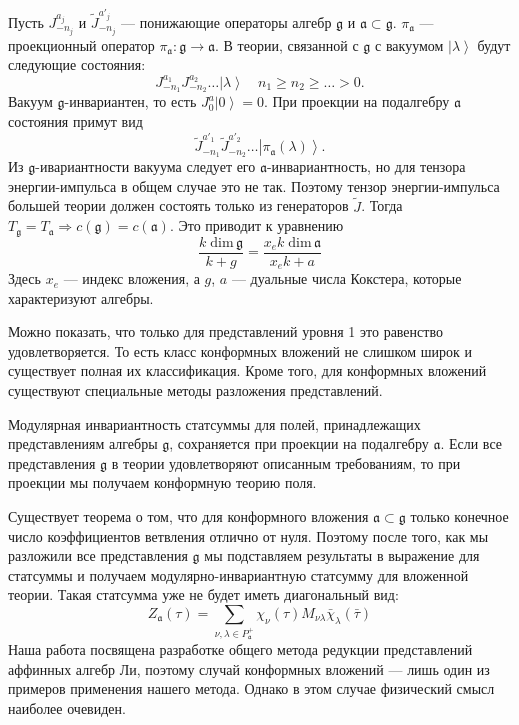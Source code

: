 \documentclass[a4paper,12pt]{article}
\theoremstyle{definition} \newtheorem{Def}{Definition}
\begin{document}
Пусть $J^{a_j}_{-n_j}$ и $\tilde{J}^{a'_j}_{-n_j}$ --- понижающие операторы алгебр  $\mathfrak{g}$ и
$\mathfrak{a}\subset\mathfrak{g}$.  $\pi_{\mathfrak{a}}$ --- проекционный оператор
$\pi_{\mathfrak{a}}:\mathfrak{g}\longrightarrow \mathfrak{a}$. В теории, связанной с  $\mathfrak{g}$
с вакуумом $\left|\lambda\right>$ будут следующие состояния:
\begin{equation}
  \label{eq:109}
  J^{a_1}_{-n_1}J^{a_2}_{-n_2}\dots\left|\lambda\right>\quad n_1\geq n_2\geq \dots>0.
\end{equation}
Вакуум $\mathfrak{g}$-инвариантен, то есть $J_0^a\left|0\right>=0$. При проекции на подалгебру
$\mathfrak{a}$ состояния примут вид
\begin{equation}
  \label{eq:110}
  \tilde{J}^{a'_1}_{-n_1}\tilde{J}^{a'_2}_{-n_2}\dots\left|\pi_{\mathfrak{a}}(\lambda)\right>.
\end{equation}
Из $\mathfrak{g}$-ивариантности вакуума следует его $\mathfrak{a}$-инвариантность, но для тензора
энергии-импульса в общем случае это не так. Поэтому тензор энергии-импульса большей теории должен
состоять только из генераторов $\tilde{J}$. Тогда $T_{\mathfrak{g}}=T_{\mathfrak{a}}\Rightarrow
c(\mathfrak{g})=c(\mathfrak{a})$. Это приводит к уравнению
\begin{equation}
  \label{eq:111}
  \frac{k\;\mathrm{dim}\,\mathfrak{g}}{k+g}=\frac{x_e k\; \mathrm{dim}\,\mathfrak{a}}{x_ek+a}
\end{equation}
Здесь $x_e$ --- индекс вложения, а  $g$, $a$ --- дуальные числа Кокстера, которые характеризуют алгебры.

Можно показать, что только для представлений уровня 1 это равенство удовлетворяется. То есть класс
конформных вложений не слишком широк и существует полная их классификация. Кроме того, для
конформных вложений существуют специальные методы разложения представлений.

Модулярная инвариантность статсуммы для полей, принадлежащих представлениям алгебры  $\mathfrak{g}$,
сохраняется при проекции на подалгебру $\mathfrak{a}$. Если все представления $\mathfrak{g}$ в теории
удовлетворяют описанным требованиям, то при проекции мы получаем конформную теорию поля.

Существует теорема о том, что для конформного вложения  $\mathfrak{a}\subset\mathfrak{g}$ только
конечное число коэффициентов ветвления отлично от нуля. Поэтому после того, как мы разложили все
представления $\mathfrak{g}$ мы подставляем результаты в выражение для статсуммы и получаем
модулярно-инвариантную статсумму для вложенной теории. Такая статсумма уже не будет иметь
диагональный вид:
\begin{equation}
  \label{eq:36}
   Z_{\mathfrak{a}}(\tau)=\sum_{ \nu,\lambda\in P^{+}_{\mathfrak{a}}} \chi_{\nu}(\tau)M_{\nu\lambda}\bar \chi_{\lambda}(\bar \tau)
\end{equation}
Наша работа посвящена разработке общего метода редукции представлений аффинных алгебр Ли, поэтому
случай конформных вложений --- лишь один из примеров применения нашего метода. Однако в этом случае
физический смысл наиболее очевиден. 
\end{document}
